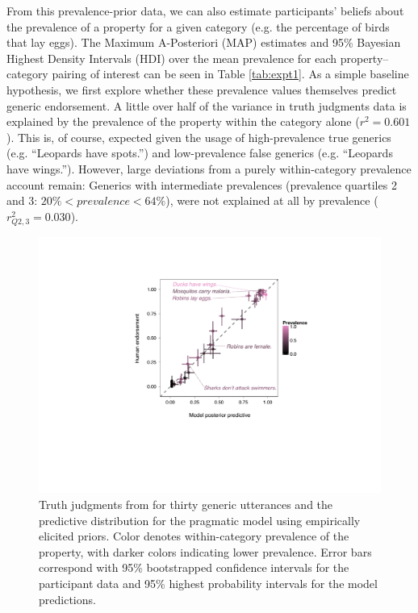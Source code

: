 \documentclass[10pt,letterpaper]{article}
\begin{document}
From this prevalence-prior data, we can also estimate participants' beliefs about the prevalence of a property for a given category (e.g. the percentage of birds that lay eggs). 
The Maximum A-Posteriori (MAP) estimates and 95\% Bayesian Highest Density Intervals (HDI) over the mean prevalence for each property--category pairing of interest can be seen in Table \ref{tab:expt1}. 
As a simple baseline hypothesis, we first explore whether these prevalence values themselves predict generic endorsement.
A little over half of the variance in truth judgments data is explained by the prevalence of the property within the category alone ($r^2 = 0.601$). 
This is, of course, expected given the usage of high-prevalence true generics (e.g. ``Leopards have spots.'') and low-prevalence false generics (e.g. ``Leopards have wings.''). 
However, large deviations from a purely within-category prevalence account remain: Generics with intermediate prevalences (prevalence quartiles 2 and 3: $ 20\% < prevalence < 64\%$), were not explained at all by prevalence ($r_{Q2,3}^2 = 0.030$).

\begin{figure}
\centering
    \includegraphics[width=0.6\columnwidth]{truthjudge-scatter-wLabels.pdf}
    \caption{Truth judgments from for thirty generic utterances and the predictive distribution for the pragmatic model using empirically elicited priors. 
    Color denotes within-category prevalence of the property, with darker colors indicating lower prevalence. 
    Error bars correspond with 95\% bootstrapped confidence intervals for the participant data and 95\% highest probability intervals for the model predictions.
    }
  \label{fig:modeldataBars}
\end{figure}

\end{document}
